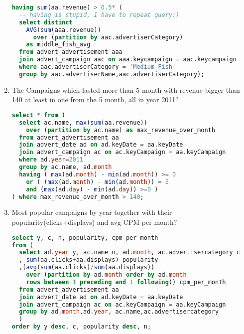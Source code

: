 \begin{enumerate}
\begin{lstlisting}[language=sql]
having sum(aa.revenue) > 0.5* (
  -- having is stupid, I have to repeat query:)
  select distinct
    AVG(sum(aaa.revenue)) 
      over (partition by aac.advertiserCategory) 
    as middle_fish_avg
  from advert_advertisement aaa 
  join advert_campaign aac on aaa.keycampaign = aac.keycampaign
  where aac.advertiserCategory = 'Medium Fish'   
  group by aac.advertiserName,aac.advertiserCategory);
  \end{lstlisting}
\item    The Campaigns which lasted more than 5 month with revenue bigger than 140 at least in one from the 5 month, all in year 2011?
  \begin{lstlisting}[language=sql] 
select * from (
  select ac.name, max(sum(aa.revenue)) 
    over (partition by ac.name) as max_revenue_over_month
  from advert_advertisement aa
  join advert_date ad on ad.keyDate = aa.keyDate
  join advert_campaign ac on ac.keyCampaign = aa.keyCampaign
  where ad.year=2011
  group by ac.name, ad.month
  having ( max(ad.month) - min(ad.month)) >= 0 
    or ( (max(ad.month) - min(ad.month)) = 5 
    and (max(ad.day) - min(ad.day)) >=0 )
) where max_revenue_over_month > 140;
  \end{lstlisting}
\item Most popular campaigns by year together with their popularity(clicks+displays) and  avg CPM per month?
  \begin{lstlisting}[language=sql] 
select y, c, n, popularity, cpm_per_month
from (
  select ad.year y, ac.name n, ad.month, ac.advertisercategory c
  , sum(aa.clicks+aa.displays) popularity
  ,(avg(sum(aa.clicks)/sum(aa.displays)) 
    over (partition by ad.month order by ad.month 
    rows between 1 preceding and 1 following)) cpm_per_month
  from advert_advertisement aa
  join advert_date ad on ad.keyDate = aa.keyDate
  join advert_campaign ac on ac.keyCampaign = aa.keyCampaign
  group by ad.month,ad.year, ac.name,ac.advertisercategory
  )
order by y desc, c, popularity desc, n;
  \end{lstlisting}
\end{enumerate}



